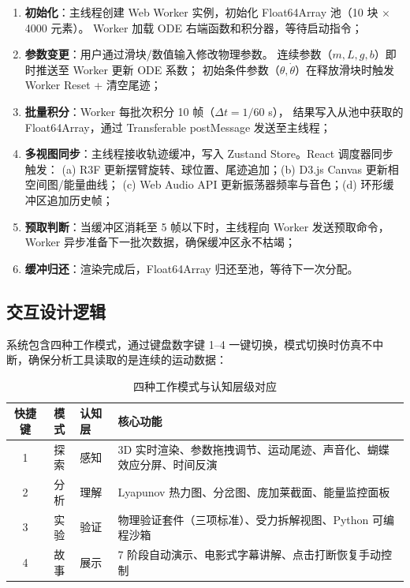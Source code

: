\begin{enumerate}[label=步骤 \arabic*:, leftmargin=*]
  \item \textbf{初始化}：主线程创建 Web Worker 实例，初始化 Float64Array 池（10 块 $\times$ 4000 元素）。
       Worker 加载 ODE 右端函数和积分器，等待启动指令；
  \item \textbf{参数变更}：用户通过滑块/数值输入修改物理参数。
       连续参数（$m, L, g, b$）即时推送至 Worker 更新 ODE 系数；
       初始条件参数（$\theta, \dot{\theta}$）在释放滑块时触发 Worker Reset + 清空尾迹；
  \item \textbf{批量积分}：Worker 每批次积分 10 帧（$\Delta t = 1/60$ s），
       结果写入从池中获取的 Float64Array，通过 Transferable postMessage 发送至主线程；
  \item \textbf{多视图同步}：主线程接收轨迹缓冲，写入 Zustand Store。React 调度器同步触发：
       (a) R3F 更新摆臂旋转、球位置、尾迹追加；(b) D3.js Canvas 更新相空间图/能量曲线；
       (c) Web Audio API 更新振荡器频率与音色；(d) 环形缓冲区追加历史帧；
  \item \textbf{预取判断}：当缓冲区消耗至 5 帧以下时，主线程向 Worker 发送预取命令，
       Worker 异步准备下一批次数据，确保缓冲区永不枯竭；
  \item \textbf{缓冲归还}：渲染完成后，Float64Array 归还至池，等待下一次分配。
\end{enumerate}

\subsection{交互设计逻辑}

系统包含四种工作模式，通过键盘数字键 1--4 一键切换，模式切换时仿真不中断，确保分析工具读取的是连续的运动数据：

\begin{table}[htbp]
  \centering
  \caption{四种工作模式与认知层级对应}
  \label{tab:modes}
  \begin{tabularx}{\textwidth}{c c l X}
    \toprule
    \textbf{快捷键} & \textbf{模式} & \textbf{认知层} & \textbf{核心功能} \\
    \midrule
    1 & 探索 & 感知 & 3D 实时渲染、参数拖拽调节、运动尾迹、声音化、蝴蝶效应分屏、时间反演 \\
    2 & 分析 & 理解 & Lyapunov 热力图、分岔图、庞加莱截面、能量监控面板 \\
    3 & 实验 & 验证 & 物理验证套件（三项标准）、受力拆解视图、Python 可编程沙箱 \\
    4 & 故事 & 展示 & 7 阶段自动演示、电影式字幕讲解、点击打断恢复手动控制 \\
    \bottomrule
  \end{tabularx}
\end{table}

